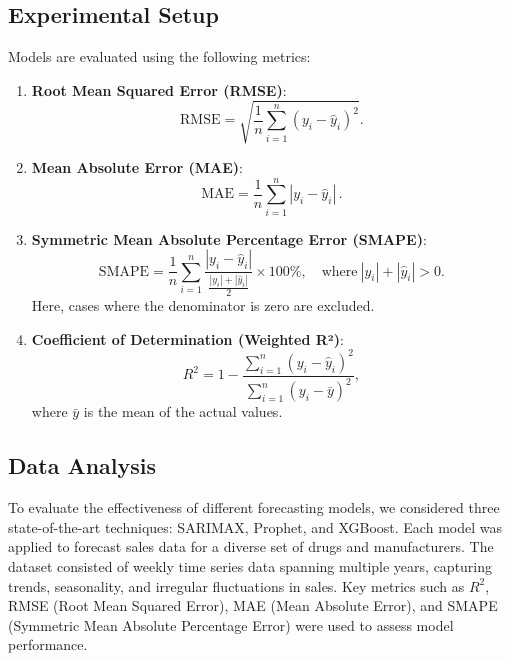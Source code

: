 \documentclass[journal]{IEEEtran}
\begin{document}
\subsection{Experimental Setup}
Models are evaluated using the following metrics:
\begin{enumerate}
    \item \textbf{Root Mean Squared Error (RMSE)}:
    \begin{equation}
    \text{RMSE}=\sqrt{\frac{1}{n}\sum_{i=1}^{n}(y_{i}-\hat{y}_{i})^{2}}.
    \end{equation}

    \item \textbf{Mean Absolute Error (MAE)}:
    \begin{equation}
    \text{MAE}=\frac{1}{n}\sum_{i=1}^{n}|y_{i}-\hat{y}_{i}|\,.
    \end{equation}

    \item \textbf{Symmetric Mean Absolute Percentage Error (SMAPE)}:
    \begin{equation}
    \text{SMAPE}=\frac{1}{n}\sum_{i=1}^{n}\frac{|y_{i}-\hat{y}_{i}|}{\frac{|y_{i}|+|\hat{y}_{i}|}{2}}\times 100\%, \quad \text{where}\ |y_{i}| + |\hat{y}_{i}| > 0.
    \end{equation}
    Here, cases where the denominator is zero are excluded.

    \item \textbf{Coefficient of Determination (Weighted R²)}:
    \begin{equation}
    R^{2}=1-\frac{\sum_{i=1}^{n}(y_{i}-\hat{y}_{i})^{2}}{\sum_{i=1}^{n}(y_{i}-\bar{y})^{2}},
    \end{equation}
    where \( \bar{y} \) is the mean of the actual values.
\end{enumerate}


\subsection{Data Analysis}

To evaluate the effectiveness of different forecasting models, we considered three state-of-the-art techniques: SARIMAX, Prophet, and XGBoost. Each model was applied to forecast sales data for a diverse set of drugs and manufacturers. The dataset consisted of weekly time series data spanning multiple years, capturing trends, seasonality, and irregular fluctuations in sales. Key metrics such as $R^2$, RMSE (Root Mean Squared Error), MAE (Mean Absolute Error), and SMAPE (Symmetric Mean Absolute Percentage Error) were used to assess model performance.
\end{document}
